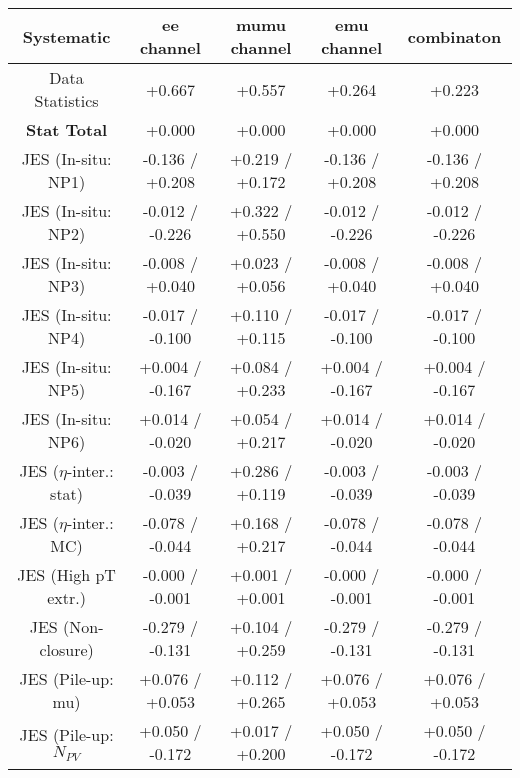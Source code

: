 \begin{table}[htbp]
\scriptsize
  \begin{center} 
  \begin{tabular}{|c|c|c|c|c|}
  \hline
Systematic                            &  ee channel&  mumu channel&  emu channel&  combinaton\\
  \hline
Data Statistics                       &+0.667              & +0.557              & +0.264              & +0.223             \\
\hline
\textbf{Stat Total}                   &+0.000              & +0.000              & +0.000              & +0.000             \\
\hline
JES (In-situ: NP1)                    &-0.136   / +0.208   & +0.219   / +0.172   & -0.136   / +0.208   & -0.136   / +0.208  \\
JES (In-situ: NP2)                    &-0.012   / -0.226   & +0.322   / +0.550   & -0.012   / -0.226   & -0.012   / -0.226  \\
JES (In-situ: NP3)                    &-0.008   / +0.040   & +0.023   / +0.056   & -0.008   / +0.040   & -0.008   / +0.040  \\
JES (In-situ: NP4)                    &-0.017   / -0.100   & +0.110   / +0.115   & -0.017   / -0.100   & -0.017   / -0.100  \\
JES (In-situ: NP5)                    &+0.004   / -0.167   & +0.084   / +0.233   & +0.004   / -0.167   & +0.004   / -0.167  \\
JES (In-situ: NP6)                    &+0.014   / -0.020   & +0.054   / +0.217   & +0.014   / -0.020   & +0.014   / -0.020  \\
JES ($\eta$-inter.: stat)               &-0.003   / -0.039   & +0.286   / +0.119   & -0.003   / -0.039   & -0.003   / -0.039  \\
JES ($\eta$-inter.: MC)                 &-0.078   / -0.044   & +0.168   / +0.217   & -0.078   / -0.044   & -0.078   / -0.044  \\
JES (High pT extr.)                  &-0.000   / -0.001   & +0.001   / +0.001   & -0.000   / -0.001   & -0.000   / -0.001  \\
JES (Non-closure)                     &-0.279   / -0.131   & +0.104   / +0.259   & -0.279   / -0.131   & -0.279   / -0.131  \\
JES (Pile-up: mu)                     &+0.076   / +0.053   & +0.112   / +0.265   & +0.076   / +0.053   & +0.076   / +0.053  \\
JES (Pile-up: $N_{PV}$                  &+0.050   / -0.172   & +0.017   / +0.200   & +0.050   / -0.172   & +0.050   / -0.172  \\

\end{tabular}
\end{center}
\end{table}
